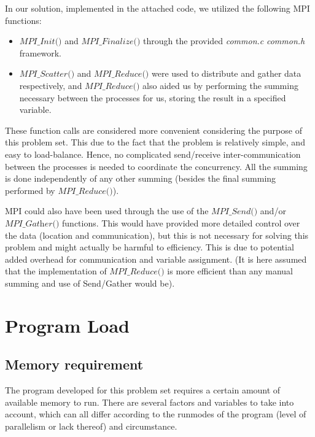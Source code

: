 \documentclass[fontsize=11pt,paper=a4,titlepage]{report}
\begin{document}
In our solution, implemented in the attached code, we utilized the following MPI
functions:

\begin{itemize}
	\item{$\textit{MPI\_Init()}$ and $\textit{
MPI\_Finalize()}$ through the provided \textit{common.c} \textit{common.h}
framework.}
	\item{$\textit{MPI\_Scatter()}$ and $\textit{MPI\_Reduce()}$ were used to
distribute 	and gather data respectively, and $\textit{MPI\_Reduce()}$ also
aided us by performing the summing necessary between the processes for us,
storing the result in a specified variable.}
\end{itemize}

These function calls are considered more convenient considering the purpose of
this problem set. This due to the fact that the problem is relatively simple,
and easy to load-balance. Hence, no complicated send/receive inter-communication
between the processes is needed to coordinate the concurrency. All the summing
is done independently of any other summing (besides the final summing performed
by $\textit{MPI\_Reduce()}$).

MPI could also have been used through the use of the $\textit{MPI\_Send()}$
and/or $\textit{MPI\_Gather()}$ functions. This would have provided more
detailed control over the data (location and communication), but this is not
necessary for solving this problem and might actually be harmful to efficiency.
This is due to potential added overhead for communication and variable
assignment. (It is here assumed that the implementation of
$\textit{MPI\_Reduce()}$ is more efficient than any manual summing and use of
Send/Gather would be).

\section{Program Load}

\subsection{Memory requirement}
\label{subsec:MemReq}

The program developed for this problem set requires a certain amount of
available memory to run. There are several factors and variables to take into
account, which can all differ according to the runmodes of the program (level of
parallelism or lack thereof) and circumstance.
\end{document}
